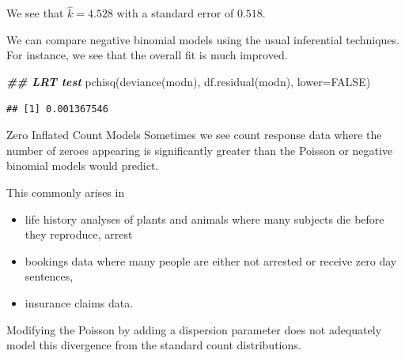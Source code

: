 \documentclass[
  ignorenonframetext,
]{beamer}
\newenvironment{Shaded}{\begin{snugshade}}{\end{snugshade}}
\newcommand{\AttributeTok}[1]{\textcolor[rgb]{0.77,0.63,0.00}{#1}}
\newcommand{\ConstantTok}[1]{\textcolor[rgb]{0.00,0.00,0.00}{#1}}
\newcommand{\DocumentationTok}[1]{\textcolor[rgb]{0.56,0.35,0.01}{\textbf{\textit{#1}}}}
\newcommand{\FunctionTok}[1]{\textcolor[rgb]{0.00,0.00,0.00}{#1}}
\newcommand{\NormalTok}[1]{#1}
\providecommand{\tightlist}{%
  \setlength{\itemsep}{0pt}\setlength{\parskip}{0pt}}
\begin{document}
\begin{frame}[fragile]{}
\protect\hypertarget{section-27}{}
We see that \(\hat k = 4.528\) with a standard error of \(0.518\).

\vspace{12pt}

We can compare negative binomial models using the usual inferential
techniques. For instance, we see that the overall fit is much improved.

\vspace{12pt}
\tiny

\begin{Shaded}
\begin{Highlighting}[]
\DocumentationTok{\#\# LRT test}
\FunctionTok{pchisq}\NormalTok{(}\FunctionTok{deviance}\NormalTok{(modn), }\FunctionTok{df.residual}\NormalTok{(modn), }\AttributeTok{lower=}\ConstantTok{FALSE}\NormalTok{)}
\end{Highlighting}
\end{Shaded}

\begin{verbatim}
## [1] 0.001367546
\end{verbatim}
\end{frame}

\begin{frame}{Zero Inflated Count Models}
\protect\hypertarget{zero-inflated-count-models}{}
Sometimes we see count response data where the number of zeroes
appearing is significantly greater than the Poisson or negative binomial
models would predict.

\vspace{12pt}

This commonly arises in

\begin{itemize}
\tightlist
\item
  life history analyses of plants and animals where many subjects die
  before they reproduce, arrest
\item
  bookings data where many people are either not arrested or receive
  zero day sentences,
\item
  insurance claims data.
\end{itemize}

\vspace{12pt}

Modifying the Poisson by adding a dispersion parameter does not
adequately model this divergence from the standard count distributions.
\end{frame}
\end{document}
